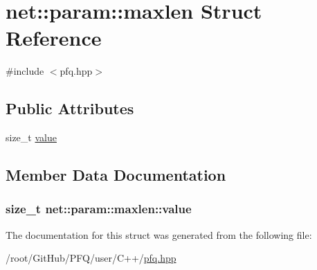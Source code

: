 \hypertarget{structnet_1_1param_1_1maxlen}{\section{net\-:\-:param\-:\-:maxlen Struct Reference}
\label{structnet_1_1param_1_1maxlen}
}


{\ttfamily \#include $<$pfq.\-hpp$>$}

\subsection*{Public Attributes}
\begin{DoxyCompactItemize}
\item 
size\-\_\-t \hyperlink{structnet_1_1param_1_1maxlen_aa6980872f44af9803747a76004a1c55a}{value}
\end{DoxyCompactItemize}


\subsection{Member Data Documentation}
\hypertarget{structnet_1_1param_1_1maxlen_aa6980872f44af9803747a76004a1c55a}{
\subsubsection[{value}]{\setlength{\rightskip}{0pt plus 5cm}size\-\_\-t net\-::param\-::maxlen\-::value}}\label{structnet_1_1param_1_1maxlen_aa6980872f44af9803747a76004a1c55a}


The documentation for this struct was generated from the following file\-:\begin{DoxyCompactItemize}
\item 
/root/\-Git\-Hub/\-P\-F\-Q/user/\-C++/\hyperlink{pfq_8hpp}{pfq.\-hpp}\end{DoxyCompactItemize}
